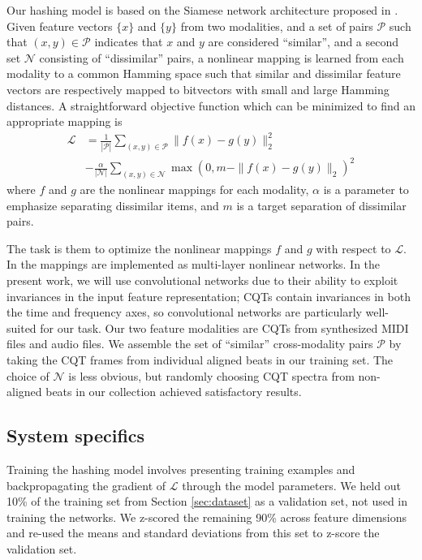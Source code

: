 \documentclass{article}
\begin{document}
Our hashing model is based on the Siamese network architecture proposed in \cite{masci2014multimodal}.
Given feature vectors $\{x\}$ and $\{y\}$ from two modalities, and a set of pairs $\mathcal{P}$ such that $(x, y) \in \mathcal{P}$ indicates that $x$ and $y$ are considered ``similar'', and a second set $\mathcal{N}$ consisting of ``dissimilar'' pairs, a nonlinear mapping is learned from each modality to a common Hamming space such that similar and dissimilar feature vectors are respectively mapped to bitvectors with small and large Hamming distances.
A straightforward objective function which can be minimized to find an appropriate mapping is
\begin{align*}
\mathcal{L} &= \frac{1}{|\mathcal{P}|} \sum_{(x, y) \in \mathcal{P}} \| f(x) - g(y) \|_2^2\\
& - \frac{\alpha}{|\mathcal{N}|} \sum_{(x, y) \in \mathcal{N}} \max(0, m - \|f(x) - g(y) \|_2)^2
\end{align*}
where $f$ and $g$ are the nonlinear mappings for each modality, $\alpha$ is a parameter to emphasize separating dissimilar items, and $m$ is a target separation of dissimilar pairs.

The task is them to optimize the nonlinear mappings $f$ and $g$ with respect to $\mathcal{L}$. 
In \cite{masci2014multimodal} the mappings are implemented as multi-layer nonlinear networks.
In the present work, we will use convolutional networks due to their ability to exploit invariances in the input feature representation; CQTs contain invariances in both the time and frequency axes, so convolutional networks are particularly well-suited for our task.
Our two feature modalities are CQTs from synthesized MIDI files and audio files.
We assemble the set of ``similar'' cross-modality pairs $\mathcal{P}$ by taking the CQT frames from individual aligned beats in our training set.
The choice of $\mathcal{N}$ is less obvious, but randomly choosing CQT spectra from non-aligned beats in our collection achieved satisfactory results.

\subsection{System specifics}

Training the hashing model involves presenting training examples and backpropagating the gradient of $\mathcal{L}$ through the model parameters.
We held out 10\% of the training set from Section \ref{sec:dataset} as a validation set, not used in training the networks.
We z-scored the remaining 90\% across feature dimensions and re-used the means and standard deviations from this set to z-score the validation set.
\end{document}
